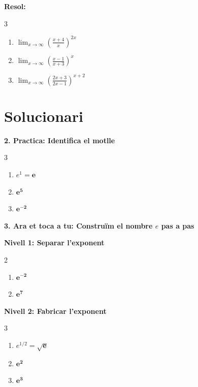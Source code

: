 \documentclass[12pt,a4paper]{article}
\begin{document}
\textbf{Resol:}
\begin{multicols}{3}
\begin{enumerate}[label=3.4.\arabic*.]
    \item $\displaystyle \lim_{x \to \infty} \left( \frac{x+4}{x} \right)^{2x}$
    \item $\displaystyle \lim_{x \to \infty} \left( \frac{x-1}{x+3} \right)^x$
    \item $\displaystyle \lim_{x \to \infty} \left( \frac{2x+3}{2x-1} \right)^{x+2}$
\end{enumerate}
\end{multicols}


\newpage
\section*{Solucionari}

\textbf{2. Practica: Identifica el motlle}
\begin{multicols}{3}
\begin{enumerate}[label=\alph*)]
    \item $e^1 = \mathbf{e}$
    \item $\mathbf{e^5}$
    \item $\mathbf{e^{-2}}$
\end{enumerate}
\end{multicols}

\vspace{0.4cm}

\textbf{3. Ara et toca a tu: Construïm el nombre $e$ pas a pas}

\textbf{Nivell 1: Separar l'exponent}
\begin{multicols}{2}
\begin{enumerate}[label=3.1.\arabic*.]
    \item $\mathbf{e^{-2}}$
    \item $\mathbf{e^7}$
\end{enumerate}
\end{multicols}

\vspace{0.2cm}

\textbf{Nivell 2: Fabricar l'exponent}
\begin{multicols}{3}
\begin{enumerate}[label=3.2.\arabic*.]
    \item $e^{1/2} = \mathbf{\sqrt{e}}$
    \item $\mathbf{e^2}$
    \item $\mathbf{e^3}$
\end{enumerate}
\end{multicols}
\end{document}
